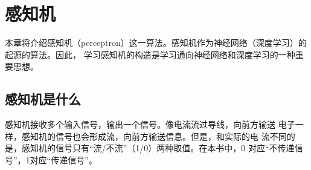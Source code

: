 \chapter{感知机}
本章将介绍感知机（perceptron）这一算法。感知机作为神经网络（深度学习）的起源的算法。因此，
学习感知机的构造是学习通向神经网络和深度学习的一种重要思想。
\section{感知机是什么}
感知机接收多个输入信号，输出一个信号。像电流流过导线，向前方输送
电子一样，感知机的信号也会形成流，向前方输送信息。但是，和实际的电
流不同的是，感知机的信号只有“流/不流”（1/0）两种取值。在本书中，0
对应“不传递信号”，1对应“传递信号”。